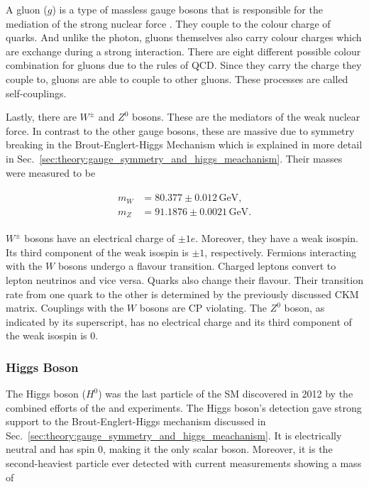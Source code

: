 \documentclass[bachelor,ngerman,english]{GAUBM}
\begin{document}
A gluon ($g$) is a type of massless gauge bosons that is responsible for the mediation of the strong nuclear force \cite{theory:qcd_01}. They couple to the colour charge of quarks. And unlike the photon, gluons themselves also carry colour charges which are exchange during a strong interaction. There are eight different possible colour combination for gluons due to the rules of QCD. Since they carry the charge they couple to, gluons are able to couple to other gluons. These processes are called self-couplings.

Lastly, there are $W^\pm$ and $Z^0$ bosons. These are the mediators of the weak nuclear force. In contrast to the other gauge bosons, these are massive due to symmetry breaking in the Brout-Englert-Higgs Mechanism which is explained in more detail in Sec.~\ref{sec:theory:gauge_symmetry_and_higgs_meachanism}. Their masses were measured to be \cite{pdg}

\begin{gather}
    \begin{aligned}
        m_W &= 80.377\pm0.012\,\text{GeV},\\
        m_Z &= 91.1876\pm0.0021\,\text{GeV}. 
        \label{eq:mass_wz}
    \end{aligned}
\end{gather}

$W^\pm$ bosons have an electrical charge of $\pm1e$. Moreover, they have a weak isospin. Its third component of the weak isospin is $\pm1$, respectively. Fermions interacting with the $W$ bosons undergo a flavour transition. Charged leptons convert to lepton neutrinos and vice versa. Quarks also change their flavour. Their transition rate from one quark to the other is determined by the previously discussed CKM matrix. Couplings with the $W$ bosons are CP violating. The $Z^0$ boson, as indicated by its superscript, has no electrical charge and its third component of the weak isospin is 0. 

\subsubsection*{Higgs Boson}
The Higgs boson ($H^0$) was the last particle of the SM discovered in 2012 \cite{theory:higgs_discovery_01,theory:higgs_discovery_02} by the combined efforts of the \atlas \cite{theory:higgs_discovery_atlas} and \cms \cite{theory:higgs_discovery_cms} experiments. The Higgs boson's detection gave strong support to the Brout-Englert-Higgs mechanism discussed in Sec.~\ref{sec:theory:gauge_symmetry_and_higgs_meachanism}. It is electrically neutral and has spin 0, making it the only scalar boson. Moreover, it is the second-heaviest particle ever detected with current measurements \cite{pdg} showing a mass of 
\end{document}
